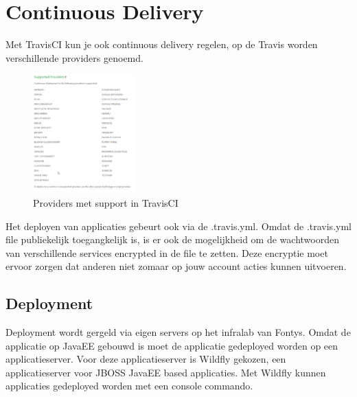 \chapter{Continuous Delivery}
Met TravisCI kun je ook continuous delivery regelen, op de Travis worden verschillende providers genoemd.

\begin{figure}[H]
	\centering\includegraphics[width=0.35\textwidth]{images/TravisCICDProviders}
	\caption{Providers met support in TravisCI}
\end{figure}
Het deployen van applicaties gebeurt ook via de .travis.yml.
Omdat de .travis.yml file publiekelijk toegangkelijk is, is er ook de mogelijkheid om de wachtwoorden van verschillende services encrypted in de file te zetten.
Deze encryptie moet ervoor zorgen dat anderen niet zomaar op jouw account acties kunnen uitvoeren.

\section{Deployment}
Deployment wordt gergeld via eigen servers op het infralab van Fontys.
Omdat de applicatie op JavaEE gebouwd is moet de applicatie gedeployed worden op een applicatieserver.
Voor deze applicatieserver is Wildfly gekozen, een applicatieserver voor JBOSS JavaEE based applicaties.
Met Wildfly kunnen applicaties gedeployed worden met een console commando.